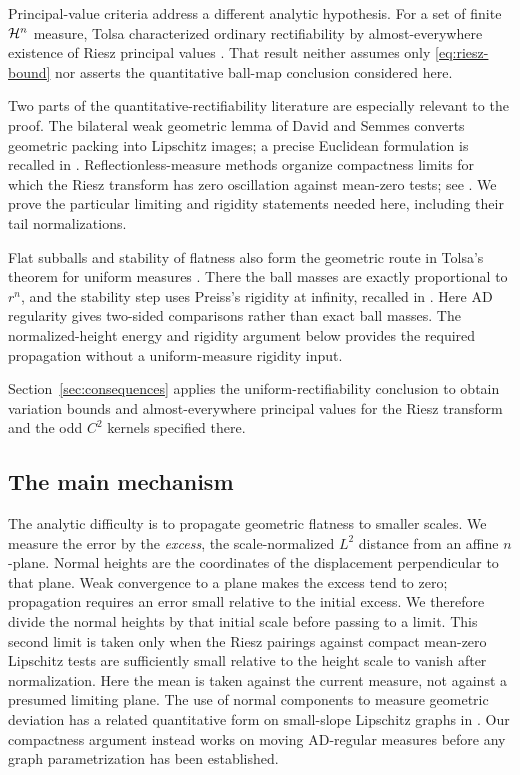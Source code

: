 Principal-value criteria address a different analytic hypothesis.
For a set of finite $\mathcal H^n$ measure, Tolsa characterized ordinary
rectifiability by almost-everywhere existence of Riesz principal values
\cite[Theorem~1.1]{Tolsa2008PrincipalValues}. That result neither assumes
only \eqref{eq:riesz-bound} nor asserts the quantitative ball-map
conclusion considered here.

Two parts of the quantitative-rectifiability literature are especially
relevant to the proof. The bilateral weak geometric lemma of David and
Semmes converts geometric packing into Lipschitz images; a precise
Euclidean formulation is recalled in
\cite[Theorem~2.5]{Tolsa2015Uniform}. Reflectionless-measure methods
organize compactness limits for which the Riesz transform has zero
oscillation against mean-zero tests; see
\cite{JayeNazarov2018I}. We prove the particular limiting and rigidity
statements needed here, including their tail normalizations.

Flat subballs and stability of flatness also form the geometric route
in Tolsa's theorem for uniform measures
\cite[Section~3]{Tolsa2015Uniform}. There the ball masses are exactly
proportional to $r^n$, and the stability step uses Preiss's rigidity at
infinity, recalled in \cite[Theorem~2.4]{Tolsa2015Uniform}.
Here AD regularity gives two-sided comparisons rather than exact ball
masses. The normalized-height energy and rigidity argument below
provides the required propagation without a uniform-measure rigidity
input.

Section~\ref{sec:consequences} applies the uniform-rectifiability
conclusion to obtain variation bounds and almost-everywhere principal
values for the Riesz transform and the odd $C^2$ kernels specified there.

\subsection{The main mechanism}

The analytic difficulty is to propagate geometric flatness to smaller
scales. We measure the error by the \emph{excess}, the scale-normalized
$L^2$ distance from an affine $n$-plane. Normal heights are the coordinates
of the displacement perpendicular to that plane. Weak convergence to a
plane makes the excess tend to zero; propagation requires an error small
relative to the initial excess. We therefore divide the normal heights
by that initial scale before passing to a limit.
This second limit is taken only when the Riesz pairings against compact
mean-zero Lipschitz tests are sufficiently small relative to the height
scale to vanish after normalization. Here the mean is taken against
the current measure, not against a presumed limiting plane.
The use of normal components to measure geometric deviation has a
related quantitative form on small-slope Lipschitz graphs in
\cite[Theorem~1.3]{Tolsa2008PrincipalValues}. Our compactness argument
instead works on moving AD-regular measures before any graph
parametrization has been established.

